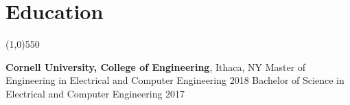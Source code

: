 \documentclass[11pt]{article} %
\begin{document}
	\section*{Education}
	\vspace{-7ex}
	\begin{center}
    \line(1,0){550}
    \end{center}
    \vspace{-1ex}
    {\large\textbf{Cornell University, College of Engineering}}, Ithaca, NY \newline
	Master of Engineering in Electrical and Computer Engineering \hfill 2018\newline
	Bachelor of Science in Electrical and Computer Engineering%
	\hfill 2017 \par %
	\vspace{-2ex}
\end{document}

